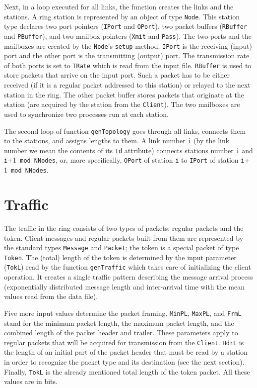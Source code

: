 Next, in a loop executed for all links, the function creates the links and the
stations.
A ring station is represented by an object of type {\tt Node}.
This station type declares two port pointers ({\tt IPort} and {\tt OPort}),
two packet buffers ({\tt RBuffer} and {\tt PBuffer}), and two
mailbox pointers ({\tt Xmit} and {\tt Pass}).
The two ports and the mailboxes
are created by the {\tt Node}'s {\tt setup} method.
{\tt IPort} is the receiving (input)
port and the other port is the transmitting (output) port.
The transmission rate of both ports is
set to {\tt TRate} which is read from the input file.
{\tt RBuffer} is used to store packets that arrive on the input port.
Such a packet has to be either
received (if it is a regular packet addressed to this
station) or relayed to the next station in the ring.
The other packet buffer stores packets that originate at the station (are
acquired by the station from the {\tt Client}).
The two mailboxes are used to synchronize two processes run at each station.

The second loop of function {\tt genTopology} goes through all links, connects
them to the stations, and assigns lengths to them.
A link number {\tt i} (by the link number we mean the contents of its {\tt Id}
attribute) connects stations number {\tt i} and
{\tt i}$+$1{\tt ~mod~NNodes},
or, more specifically, {\tt OPort} of station {\tt i} to {\tt IPort} of
station
{\tt i}$+$1{\tt ~mod~NNodes}.

\section{Traffic}

The traffic in the ring consists of two types of packets: regular packets
and the token.
Client messages and regular packets built from them are represented by the
standard types {\tt Message} and {\tt Packet};
the token is a special packet of type {\tt Token}.
The (total) length of the token is determined by the
input parameter ({\tt TokL})
read by the function {\tt genTraffic} which takes care of initializing the
client operation.
It creates a single traffic pattern describing the message arrival
process (exponentially distributed message length and inter-arrival time with
the mean values read from the data file).

Five more input values determine the packet framing.
{\tt MinPL}, {\tt MaxPL}, and {\tt FrmL} stand for the minimum packet length,
the maximum packet length, and the combined length of the packet header
and trailer.
These parameters apply to regular packets that will be acquired for transmission
from the {\tt Client}.
{\tt HdrL} is the length of an initial part of the packet header that must
be read by a station
in order to recognize the packet type and its destination
(see the next section).
Finally, {\tt TokL} is the already mentioned total length of the token packet.
All these values are in bits.

